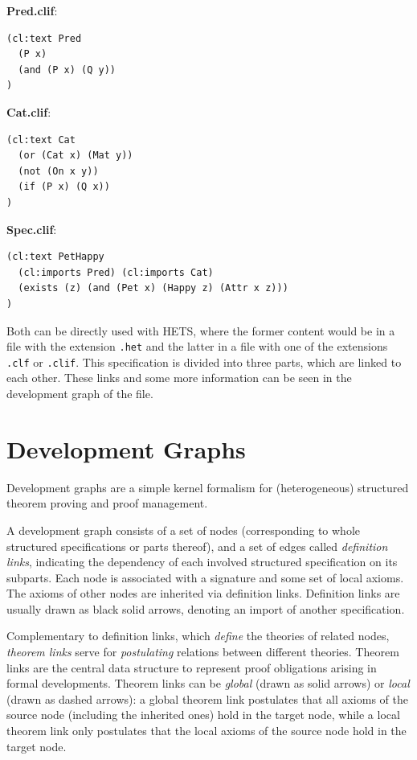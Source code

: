 \documentclass{article}
\newcommand{\normalTEXTSC}[2]{{#1\scriptsize#2}}
\newcommand     {\Hets}{\normalTEXTSC{H}{ETS}\xspace}
\begin{document}
\textbf{Pred.clif}:
\begin{lstlisting}[language=clif]
(cl:text Pred 
  (P x)
  (and (P x) (Q y))
)
\end{lstlisting}

\textbf{Cat.clif}:
\begin{lstlisting}[language=clif]
(cl:text Cat 
  (or (Cat x) (Mat y))
  (not (On x y))
  (if (P x) (Q x))
)
\end{lstlisting}

\textbf{Spec.clif}:
\begin{lstlisting}[language=clif]
(cl:text PetHappy 
  (cl:imports Pred) (cl:imports Cat)
  (exists (z) (and (Pet x) (Happy z) (Attr x z)))
)
\end{lstlisting}

Both can be directly used with \Hets, where the former content would be in a 
file with the extension \texttt{.het} and the latter in a file with one of the extensions 
\texttt{.clf} or \texttt{.clif}. This specification is divided into three 
parts, which are linked to each other. These links and some more information can 
be seen in the development graph of the file.


\section{Development Graphs}\label{sec:DevGraph}

Development graphs are a simple kernel formalism for (heterogeneous)
structured theorem proving and proof management.

A development graph consists of a set of nodes (corresponding to whole
structured specifications or parts thereof), and a set of edges
called \emph{definition links}, indicating the dependency of each
involved structured specification on its subparts.  Each node is
associated with a signature and some set of local axioms.  The axioms
of other nodes are inherited via definition links.  Definition links
are usually drawn as black solid arrows, denoting an import of another
specification.

Complementary to definition links, which \emph{define} the theories of
related nodes, \emph{theorem links} serve for \emph{postulating}
relations between different theories. Theorem links are the central
data structure to represent proof obligations arising in formal
developments.
Theorem links can be \emph{global} (drawn as solid arrows) or
\emph{local} (drawn as dashed arrows): a global theorem link
postulates that all axioms of the source node (including the inherited
ones) hold in the target node, while a local theorem link only postulates
that the local axioms of the source node hold in the target node.
\end{document}

